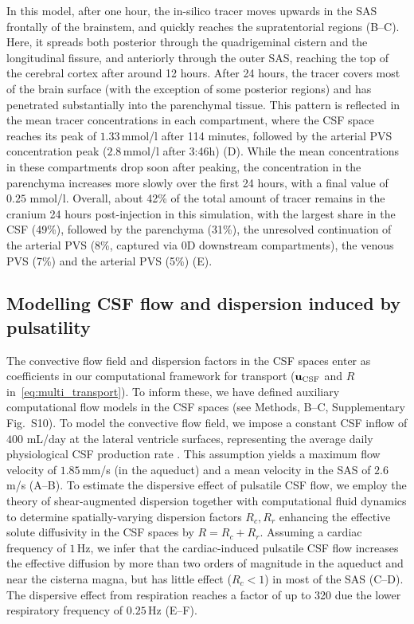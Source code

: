 \documentclass[fleqn,10pt]{wlscirep}
\begin{document}
In this model, after one hour, the in-silico tracer moves upwards in
the SAS frontally of the brainstem, and quickly reaches the
supratentorial regions (B--C). Here, it spreads
both posterior through the quadrigeminal cistern and the longitudinal
fissure, and anteriorly through the outer SAS, reaching the top of the
cerebral cortex after around 12 hours. After 24 hours, the tracer
covers most of the brain surface (with the exception of some posterior
regions) and has penetrated substantially into the parenchymal
tissue. This pattern is reflected in the mean tracer concentrations in
each compartment, where the CSF space reaches its peak of
$1.33\,$mmol/l after 114 minutes, followed by the arterial PVS
concentration peak ($2.8\,$mmol/l after 3:46h)
(D). While the mean concentrations in
these compartments drop soon after peaking, the concentration in the
parenchyma increases more slowly over the first 24 hours, with a final
value of $0.25$ mmol/l. Overall, about 42\% of the total amount of
tracer remains in the cranium 24 hours post-injection in this
simulation, with the largest share in the CSF (49\%), followed by the
parenchyma (31\%), the unresolved continuation of the arterial PVS (8\%, captured via 0D downstream compartments), the venous PVS (7\%) and the arterial PVS (5\%)
(E).




\subsection*{Modelling CSF flow and dispersion induced by pulsatility}

The convective flow field and dispersion factors in the CSF spaces
enter as coefficients in our computational framework for transport
($\mathbf{u}_{\rm CSF}$ and $R$ in~\eqref{eq:multi_transport}). To inform
these, we have defined auxiliary computational flow models in the CSF
spaces (see Methods, B--C, Supplementary Fig.~S10). 
To model the convective flow field, we impose a constant
CSF inflow of $400$ mL/day at the lateral ventricle surfaces,
representing the average daily physiological CSF production rate
\cite{lehtinen2013choroid}. This assumption yields a maximum flow
velocity of $1.85\,$mm/s (in the aqueduct) and a mean velocity in the
SAS of $2.6$ \textmu m/s (A--B). To estimate the
dispersive effect of pulsatile CSF flow, we employ the theory of
shear-augmented dispersion together with computational fluid dynamics
to determine spatially-varying dispersion factors $R_c, R_r$ enhancing
the effective solute diffusivity in the CSF spaces by $R = R_c +
R_r$. Assuming a cardiac frequency of $1\,$Hz, we infer that the
cardiac-induced pulsatile CSF flow increases the effective diffusion
by more than two orders of magnitude in the aqueduct and near the
cisterna magna, but has little effect ($R_c < 1$) in most of the SAS
(C--D). The dispersive effect from respiration
reaches a factor of up to 320 due the lower respiratory frequency of
$0.25\,$Hz (E--F).
  
\end{document}

